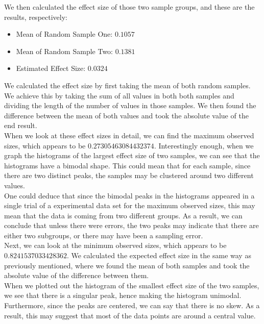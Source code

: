\documentclass[a4paper,twocolumn]{article}
\begin{document}
\newpage

We then calculated the effect size of those two sample groups, and these are the results, respectively:
\begin{itemize}
    \item Mean of Random Sample One:  $0.1057$
    \item Mean of Random Sample Two:  $0.1381$
    \item Estimated Effect Size:  $0.0324$
\end{itemize}

We calculated the effect size by first taking the mean of both random samples. We achieve this by taking the sum of 
all values in both both samples and dividing the length of the number of values in those samples. We then found the 
difference between the mean of both values and took the absolute value of the end result. \\

When we look at these effect sizes in detail, we can find the maximum observed sizes, which appears to be 
$0.27305463084432374$. Interestingly enough, when we graph the histograms of the largest effect size of 
two samples, we can see that the histograms have a bimodal shape. This could mean that for each sample, since there 
are two distinct peaks, the samples may be clustered around two different values. \\

One could deduce that since the bimodal peaks in the histograms appeared in a single trial of a experimental data set
for the maximum observed sizes, this may mean that the data is coming from two different groups. As a result, we can 
conclude that unless there were errors, the two peaks may indicate that there are either two subgroups, or there may 
have been a sampling error. \\

Next, we can look at the minimum observed sizes, which appears to be $0.8241537033428362$. We calculated the expected
effect size in the same way as previously mentioned, where we found the mean of both samples and took the absolute 
value of the difference between them. \\

When we plotted out the histogram of the smallest effect size of the two samples, we see that there is a singular peak,
hence making the histogram unimodal. Furthermore, since the peaks are centered, we can say that there is no skew. As a 
result, this may suggest that most of the data points are around a central value. \\
\end{document}
